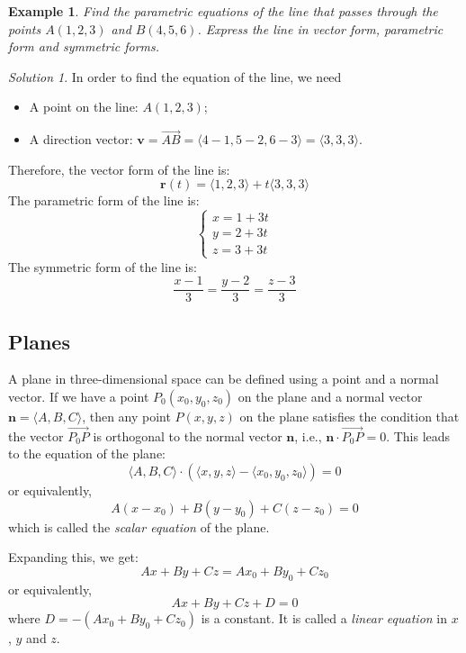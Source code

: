 \documentclass{book}
\newtheorem{example}{Example}[chapter]
\theoremstyle{remark}
\newtheorem*{solution}{Solution}
\begin{document}
\begin{example}
    Find the parametric equations of the line that passes through the points $A(1, 2, 3)$ and $B(4, 5, 6)$. Express the line in vector form, parametric form and symmetric forms.
\end{example}
\begin{solution}
    In order to find the equation of the line, we need 
    \begin{itemize}
        \item A point on the line: $A(1, 2, 3)$;
        \item A direction vector: $\mathbf{v} = \overrightarrow{AB} = \langle 4 - 1, 5 - 2, 6 - 3 \rangle = \langle 3, 3, 3 \rangle$.
    \end{itemize}
    Therefore, the vector form of the line is:
    \[
        \mathbf{r}(t) = \langle 1, 2, 3 \rangle + t \langle 3, 3, 3 \rangle
    \]
    The parametric form of the line is:
    \[
        \begin{cases}
            x = 1 + 3t \\
            y = 2 + 3t \\
            z = 3 + 3t
        \end{cases}
    \]
    The symmetric form of the line is:
    \[
        \frac{x - 1}{3} = \frac{y - 2}{3} = \frac{z - 3}{3}
    \]
\end{solution}

\subsection{Planes}

A plane in three-dimensional space can be defined using a point and a normal vector. If we have a point $P_0(x_0, y_0, z_0)$ on the plane and a normal vector $\mathbf{n} = \langle A, B, C \rangle$, then any point $P(x, y, z)$ on the plane satisfies the condition that the vector $\overrightarrow{P_0P}$ is orthogonal to the normal vector $\mathbf{n}$, i.e., $\mathbf{n} \cdot \overrightarrow{P_0P} = 0$. This leads to the equation of the plane:
\[
    \langle A, B, C \rangle \cdot (\langle x, y, z \rangle - \langle x_0, y_0, z_0 \rangle) = 0
\]
or equivalently,
\[
    A(x - x_0) + B(y - y_0) + C(z - z_0) = 0
\]
which is called the \emph{scalar equation} of the plane. 

Expanding this, we get:
\[
    Ax + By + Cz = Ax_0 + By_0 + Cz_0
\]
or equivalently,
\[
    Ax + By + Cz + D = 0
\]
where $D = -(Ax_0 + By_0 + Cz_0)$ is a constant. It is called a \emph{linear equation} in $x$, $y$ and $z$.
\end{document}
